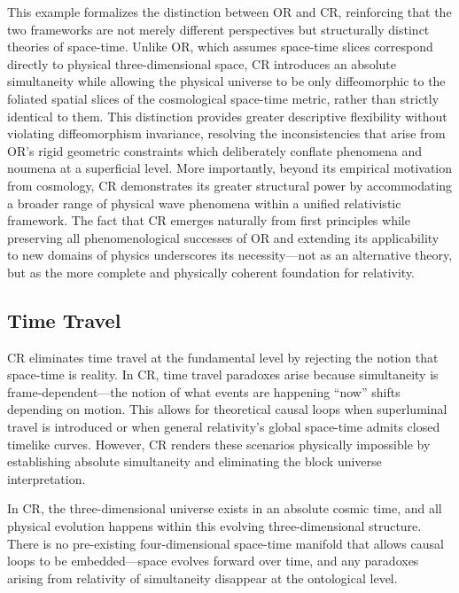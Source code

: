 \documentclass[aps,prd,reprint,superscriptaddress]{revtex4-2}
\begin{document}
This example formalizes the distinction between OR and CR, reinforcing that the two frameworks are not merely different perspectives but structurally distinct theories of space-time. Unlike OR, which assumes space-time slices correspond directly to physical three-dimensional space, CR introduces an absolute simultaneity while allowing the physical universe to be only diffeomorphic to the foliated spatial slices of the cosmological space-time metric, rather than strictly identical to them. This distinction provides greater descriptive flexibility without violating diffeomorphism invariance, resolving the inconsistencies that arise from OR's rigid geometric constraints which deliberately conflate phenomena and noumena at a superficial level. More importantly, beyond its empirical motivation from cosmology, CR demonstrates its greater structural power by accommodating a broader range of physical wave phenomena within a unified relativistic framework. The fact that CR emerges naturally from first principles while preserving all phenomenological successes of OR and extending its applicability to new domains of physics underscores its necessity---not as an alternative theory, but as the more complete and physically coherent foundation for relativity.

\subsection{Time Travel}

CR eliminates time travel at the fundamental level by rejecting the notion that space-time is reality. In CR, time travel paradoxes arise because simultaneity is frame-dependent---the notion of what events are happening ``now'' shifts depending on motion. This allows for theoretical causal loops when superluminal travel is introduced or when general relativity's global space-time admits closed timelike curves. However, CR renders these scenarios physically impossible by establishing absolute simultaneity and eliminating the block universe interpretation.  

In CR, the three-dimensional universe exists in an absolute cosmic time, and all physical evolution happens within this evolving three-dimensional structure. There is no pre-existing four-dimensional space-time manifold that allows causal loops to be embedded---space evolves forward over time, and any paradoxes arising from relativity of simultaneity disappear at the ontological level.  
\end{document}
